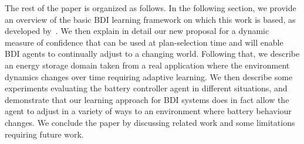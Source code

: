 The rest of the paper is organized as follows.
In the following section, we provide an overview of the basic BDI learning framework on which this work is based, as developed by~\cite{airiau09:enhancing,singh10:extending,singh10:learning}. 
We then explain in detail our new proposal for a dynamic measure of confidence that can be used at plan-selection time and will enable BDI agents to continually adjust to a changing world. 
Following that, we describe an energy storage domain taken from a real application where the environment dynamics changes over time requiring adaptive learning. We then describe some experiments evaluating the battery controller agent in different situations, and demonstrate that our learning approach for BDI systems does in fact allow the agent to adjust in a variety of ways to an environment where battery behaviour changes. 
We conclude the paper by discussing related work and some limitations requiring future work.


